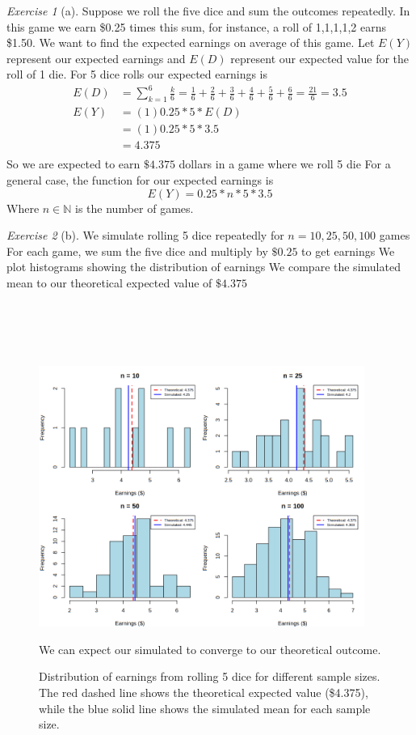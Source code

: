 \documentclass[12pt]{amsart}
\theoremstyle{remark}
\newtheorem*{exercise}{Exercise}%
\def\NN{\ensuremath{\mathbb N}}
\theoremstyle{mycomment}
\begin{document}
\begin{exercise}[a]
Suppose we roll the five dice and sum the outcomes repeatedly. In this game we earn \$0.25 times this
	sum, for instance, a roll of 1,1,1,1,2 earns \$1.50. We want to find the expected earnings on average of this game. Let $E(Y)$ represent our expected earnings and $E(D)$ represent our expected value for the roll of 1 die. For 5 dice rolls our expected earnings is
	\begin{align*}
		E(D) &= \sum_{k=1}^{6} \frac{k}{6} = \frac{1}{6} + \frac{2}{6} + \frac{3}{6} + \frac{4}{6} + \frac{5}{6} + \frac{6}{6} = \frac{21}{6} = 3.5 \\
		E(Y) &= (1)0.25 * 5 * E(D) \\
		     &= (1)0.25 * 5 * 3.5 \\
		     &= 4.375 \\
	\end{align*}
	So we are expected to earn $ \$4.375$ dollars in a game where we roll 5 die
	For a general case, the function for our expected earnings is $$E(Y) = 0.25 * n * 5 * 3.5$$ Where $n \in \NN$ is the number of games.
\end{exercise}
\begin{exercise}[b]
We simulate rolling 5 dice repeatedly for $n = 10, 25, 50, 100$ games
For each game, we sum the five dice and multiply by $\$0.25$ to get earnings
We plot histograms showing the distribution of earnings
We compare the simulated mean to our theoretical expected value of $\$4.375$
\\ \\ \\ \\ \\
\begin{figure}[h!]
\centering
\includegraphics[width=0.95\textwidth]{figures/problem1b.png}
\caption{Distribution of earnings from rolling 5 dice for different sample sizes. The red dashed line shows the theoretical expected value (\$4.375), while the blue solid line shows the simulated mean for each sample size.} We can expect our simulated to converge to our theoretical outcome.
\label{fig:problem1b}
\end{figure}

\end{exercise}
\end{document}
